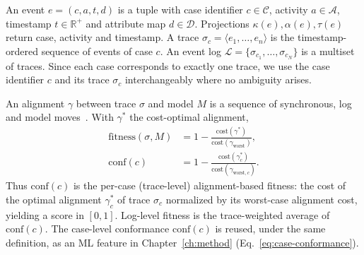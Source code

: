 \begin{definition}
\label{def:event}
\label{def:event-log}
An event $e = (c, a, t, d)$ is a tuple with case identifier
$c \in \mathcal{C}$, activity $a \in \mathcal{A}$, timestamp
$t \in \mathbb{R}^+$ and attribute map $d \in \mathcal{D}$. Projections
$\kappa(e), \alpha(e), \tau(e)$ return case, activity and timestamp. A
trace $\sigma_c = \langle e_1, \ldots, e_n \rangle$ is the
timestamp-ordered sequence of events of case $c$. An event log
$\mathcal{L} = \{\sigma_{c_1}, \ldots, \sigma_{c_N}\}$ is a multiset of
traces. Since each case corresponds to exactly one trace, we use the case
identifier $c$ and its trace $\sigma_c$ interchangeably where no ambiguity
arises.
\end{definition}

\begin{definition}
\label{def:alignment}
\label{def:fitness}
An alignment $\gamma$ between trace $\sigma$ and model $M$ is a sequence
of synchronous, log and model moves~\cite{adriansyah2011alignments}. With
$\gamma^*$ the cost-optimal alignment,
\begin{align}
\text{fitness}(\sigma, M) &= 1 - \frac{\text{cost}(\gamma^*)}
{\text{cost}(\gamma_{\text{worst}})}, \label{eq:fitness} \\
\text{conf}(c) &= 1 - \frac{\text{cost}(\gamma^*_c)}
{\text{cost}(\gamma_{\text{worst},c})}. \label{eq:case-conformance-cap2}
\end{align}
Thus $\text{conf}(c)$ is the per-case (trace-level) alignment-based fitness:
the cost of the optimal alignment $\gamma^*_c$ of trace $\sigma_c$ normalized
by its worst-case alignment cost, yielding a score in $[0,1]$. Log-level
fitness is the trace-weighted average of $\text{conf}(c)$. The case-level
conformance $\text{conf}(c)$ is reused, under the same definition, as an ML
feature in Chapter~\ref{ch:method}
(Eq.~\ref{eq:case-conformance}).
\end{definition}

